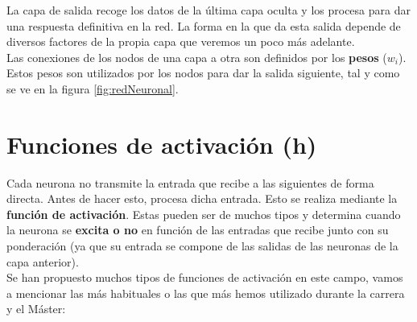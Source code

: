 \documentclass[11pt,fleqn]{book} %
\begin{document}
La capa de salida recoge los datos de la última capa oculta y los procesa para dar una respuesta definitiva en la red. La forma en la que da esta salida depende de diversos factores de la propia capa que veremos un poco más adelante. \\

Las conexiones de los nodos de una capa a otra son definidos por los \textbf{pesos} ($w_i$). Estos pesos son utilizados por los nodos para dar la salida siguiente, tal y como se ve en la figura \ref{fig:redNeuronal}.

\section{Funciones de activación (h)}\label{sec:activacion}

Cada neurona no transmite la entrada que recibe a las siguientes de forma directa. Antes de hacer esto, procesa dicha entrada. Esto se realiza mediante la \textbf{función de activación}. Estas pueden ser de muchos tipos y determina cuando la neurona se \textbf{excita o no} en función de las entradas que recibe junto con su ponderación (ya que su entrada se compone de las salidas de las neuronas de la capa anterior)\cite{article:redNeuronal2}. \\

Se han propuesto muchos tipos de funciones de activación en este campo, vamos a mencionar las más habituales o las que más hemos utilizado durante la carrera y el Máster: \\
\end{document}
